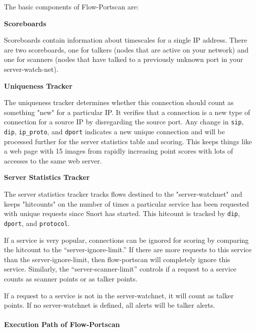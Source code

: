 \documentclass[english]{report}
\newcounter{slistnum}
\newenvironment{slist}
{ \begin{list}{ {\bf \arabic{slistnum}.} }{\usecounter{slistnum} } }
{ \end{list} }
\begin{document}
The basic components of Flow-Portscan are:
\begin{slist}
\item \textbf{Scoreboards}

Scoreboards contain information about timescales for a single IP address.  There are two scoreboards, one for talkers (nodes that are active on your network) and one for scanners (nodes that have talked to a previously unknown port in your server-watch-net).
 
\item \textbf{Uniqueness Tracker}

The uniqueness tracker determines whether this connection should count as something "new" for a particular IP.  It verifies that a connection is a new type of connection for a source IP by disregarding the source port.  Any change in \texttt{sip}, \texttt{dip}, \texttt{ip\_proto}, and \texttt{dport} indicates a new unique connection and will be processed further for the server statistics table and scoring.  This keeps things like a web page with 15 images from rapidly increasing point scores with lots of accesses to the same web server.
\item \textbf{Server Statistics Tracker}

The server statistics tracker tracks flows destined to the "server-watchnet" and keeps "hitcounts" on the number of times a particular service has been requested with unique requests since Snort has started.  This hitcount is tracked by \texttt{dip}, \texttt{dport}, and \texttt{protocol}.
\end{slist}

If a service is very popular, connections can be ignored for scoring by
comparing the hitcount to the ``server-ignore-limit.'' If there are more requests
to this service than the server-ignore-limit, then flow-portscan will
completely ignore this service.  Similarly, the ``server-scanner-limit'' controls
if a request to a service counts as scanner points or as talker points.

If a request to a service is not in the server-watchnet, it will count as
talker points. If no server-watchnet is defined, all alerts will be talker
alerts.


\paragraph{Execution Path of Flow-Portscan}
\end{document}
